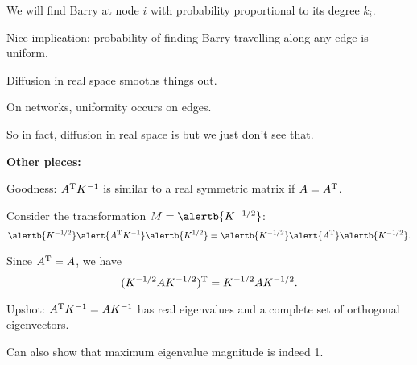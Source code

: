     We will find Barry at node $i$ with probability
    proportional to its degree $k_i$.
  
    Nice implication: probability of finding Barry travelling along
    any edge is \alert{uniform}.
  
    Diffusion in real space smooths things out.
  
    On networks, uniformity occurs on edges.
  
    So in fact, diffusion in real space is 
    but we just don't see that.
  


  \textbf{Other pieces:}

  
  
    Goodness: $A^{\textnormal{T}} K^{-1}$ is similar to a real symmetric matrix
    if $A = A^{\textnormal{T}}$.
  
    Consider the transformation $M = \alertb{K^{-1/2}}$:
    $$
    \alertb{K^{-1/2}}
    \alert{A^{\textnormal{T}} K^{-1}}
    \alertb{K^{1/2}}
    =
    \alertb{K^{-1/2}}
    \alert{A^{\textnormal{T}}}
    \alertb{K^{-1/2}}.
    $$
  
    Since $A^{\textnormal{T}} = A$, we 
    have 
    $$
    ({K^{-1/2}}
    {A}
    {K^{-1/2}})^{\textnormal{T}}
    =
    {K^{-1/2}}
    {A}
    {K^{-1/2}}.
    $$
  
    Upshot: $A^{\textnormal{T}} K^{-1} = A K^{-1}$ has real eigenvalues and a complete
    set of orthogonal eigenvectors.
  
    Can also show that maximum eigenvalue magnitude is indeed 1.
  


